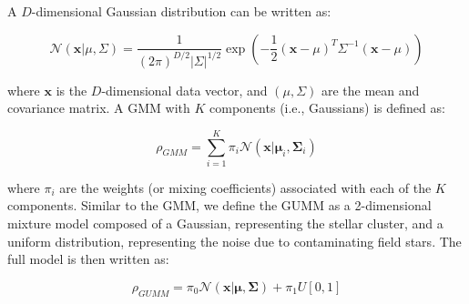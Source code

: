 \documentclass[draft]{aa}
\begin{document}
 A $D$-dimensional Gaussian distribution can be written as:

 \begin{equation}
 \mathcal{N}(\mathbf{x} | \mu, \Sigma)=
 \frac{1}{(2 \pi)^{D / 2}|\Sigma|^{1 / 2}}
 \exp \left(-\frac{1}{2}(\mathbf{x}-\mu)^{T} \Sigma^{-1}(\mathbf{x}-\mu)\right)
 \end{equation}

 \noindent where $\mathbf{x}$ is the $D$-dimensional data vector, and $
 (\mu,\Sigma)$ are the mean and covariance matrix.
 A GMM with $K$ components (i.e., Gaussians) is defined as:

 \begin{equation}
 \rho_{GMM}=\sum_{i=1}^{K} \pi_{i}
 \mathcal{N}\left(\boldsymbol{\mathbf{x} | \mu}_{i}, \boldsymbol{\Sigma}_{i}\right)
 \end{equation}

 \noindent where $\pi_i$ are the weights (or mixing coefficients)
 associated with each of the $K$ components. Similar to the GMM, we define the
 GUMM as a 2-dimensional mixture model composed of a Gaussian, representing
 the stellar cluster, and a uniform distribution, representing the noise due
 to contaminating field stars. The full model is then written as:

 \begin{equation}
 \rho_{GUMM}=
 \pi_{0} \mathcal{N}\left(\boldsymbol{\mathbf{x} | \mu}, \boldsymbol{\Sigma}\right)+
 \pi_{1} U[0,1]
 \end{equation}
\end{document}
